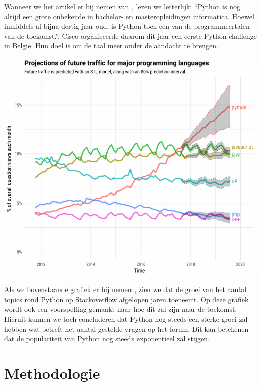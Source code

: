Wanneer we het artikel er bij nemen van \textcite{Cisco2018}, lezen we letterlijk: “Python is nog altijd een grote onbekende in bachelor- en masteropleidingen informatica. Hoewel inmiddels al bijna dertig jaar oud, is Python toch een van de programmeertalen van de toekomst.”. Cisco organiseerde daarom dit jaar een eerste Python-challenge in België. Hun doel is om de taal meer onder de aandacht te brengen. 

\includegraphics{graph.png}

Als we bovenstaande grafiek er bij nemen \autocite{SO2017}, zien we dat de groei van het aantal topics rond Python op Stackoverflow afgelopen jaren toeneemt. Op deze grafiek wordt ook een voorspelling gemaakt naar hoe dit zal zijn naar de toekomst. Hieruit kunnen we toch concluderen dat Python nog steeds een sterke groei zal hebben wat betreft het aantal gestelde vragen op het forum. Dit kan betekenen dat de populariteit van Python nog steeds exponentieel zal stijgen. 






\section{Methodologie}
\label{sec:methodologie}

